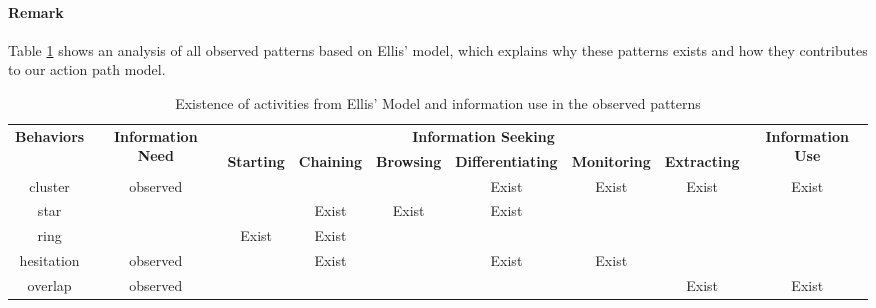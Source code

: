 \paragraph{Remark} Table \ref{table:ellis-pattern} shows an analysis of all observed patterns
based on Ellis' model, which explains why these patterns exists and how they contributes to our action path model.

\begin{table}
    \small
    \centering
    \caption{Existence of activities from Ellis' Model and information use in the observed patterns}
    \begin{adjustbox}{width=\textwidth}
        \begin{tabular}{ccccccccc}
            \toprule
            \multicolumn{1}{c}{\multirow{2}{*}{\textbf{Behaviors}}}  & \multicolumn{1}{c}{\multirow{2}{*}{\textbf{Information Need}}} & \multicolumn{6}{c}{\textbf{Information Seeking}}                                    & \multicolumn{1}{c}{\multirow{2}{*}{\textbf{Information Use}}} \\ \cline{3-8}
            \multicolumn{1}{c}{}                                     & \multicolumn{1}{c}{}                                  & \textbf{Starting} & \textbf{Chaining} & \textbf{Browsing} & \textbf{Differentiating} & \textbf{Monitoring} & \textbf{Extracting} & \multicolumn{1}{c}{}  \\
            \hline
            cluster    &   observed &       &       &       & Exist & Exist & Exist & Exist \\
            star       &            &       & Exist & Exist & Exist &       &       &       \\
            ring       &            & Exist & Exist &       &       &       &       &       \\
            hesitation &   observed &       & Exist &       & Exist & Exist &       &       \\
            overlap    &   observed &       &       &       &       &       & Exist & Exist \\
            \bottomrule
        \end{tabular}
        \label{table:ellis-pattern}
    \end{adjustbox}
\end{table}

